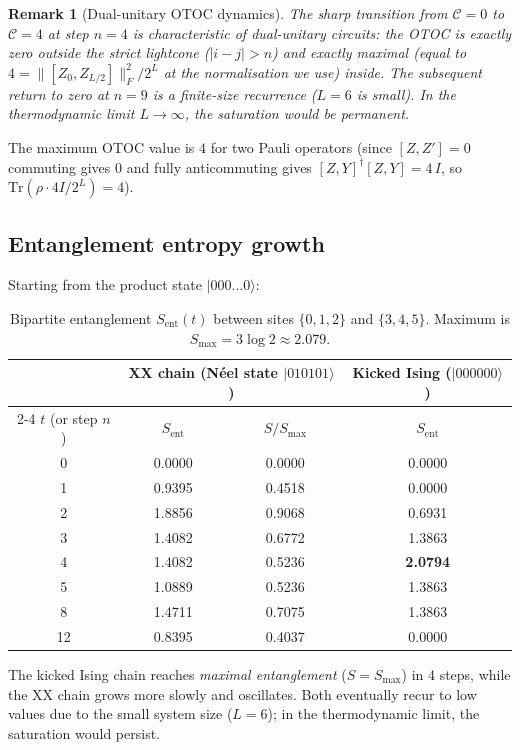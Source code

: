 \documentclass[12pt,a4paper]{article}
\newtheorem{remark}[theorem]{Remark}
\begin{document}
\begin{remark}[Dual-unitary OTOC dynamics]
  The sharp transition from $\mathcal{C} = 0$ to $\mathcal{C} = 4$ at step $n = 4$
  is characteristic of dual-unitary circuits: the OTOC is exactly zero outside the
  strict lightcone ($|i - j| > n$) and exactly maximal (equal to
  $4 = \|[Z_0, Z_{L/2}]\|_F^2 / 2^L$ at the normalisation we use) inside.
  The subsequent return to zero at $n = 9$ is a finite-size recurrence ($L = 6$
  is small).  In the thermodynamic limit $L \to \infty$, the saturation would be
  permanent.
\end{remark}

The maximum OTOC value is $4$ for two Pauli operators (since $[Z, Z'] = 0$ commuting
gives $0$ and fully anticommuting gives $[Z, Y]^\dagger [Z, Y] = 4\,I$, so
$\mathrm{Tr}(\rho \cdot 4I/2^L) = 4$).

\subsection{Entanglement entropy growth}

Starting from the product state $|000\ldots0\rangle$:

\begin{table}[h]
\centering
\caption{Bipartite entanglement $S_{\mathrm{ent}}(t)$ between sites $\{0,1,2\}$ and
$\{3,4,5\}$.  Maximum is $S_{\max} = 3\log 2 \approx 2.079$.}
\label{tab:ent}
\begin{tabular}{cccc}
\hline
 & \multicolumn{2}{c}{XX chain (Néel state $|010101\rangle$)} &
   Kicked Ising ($|000000\rangle$) \\
\cline{2-4}
$t$ (or step $n$) & $S_{\mathrm{ent}}$ & $S/S_{\max}$  & $S_{\mathrm{ent}}$ \\
\hline
0   & 0.0000 & 0.0000 & 0.0000 \\
1   & 0.9395 & 0.4518 & 0.0000 \\
2   & 1.8856 & 0.9068 & 0.6931 \\
3   & 1.4082 & 0.6772 & 1.3863 \\
4   & 1.4082 & 0.5236 & \textbf{2.0794} \\
5   & 1.0889 & 0.5236 & 1.3863 \\
8   & 1.4711 & 0.7075 & 1.3863 \\
12  & 0.8395 & 0.4037 & 0.0000 \\
\hline
\end{tabular}
\end{table}

The kicked Ising chain reaches \emph{maximal entanglement} ($S = S_{\max}$) in 4
steps, while the XX chain grows more slowly and oscillates.  Both eventually recur
to low values due to the small system size ($L = 6$); in the thermodynamic limit,
the saturation would persist.
\end{document}
